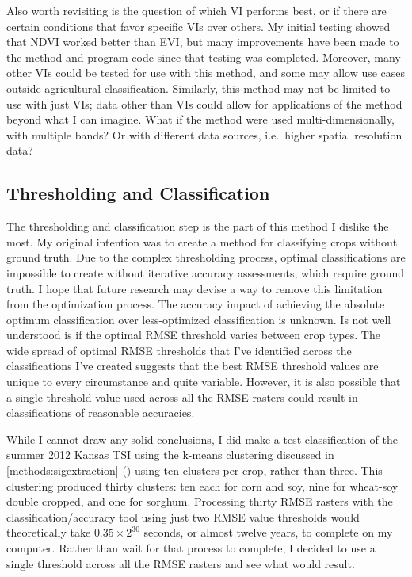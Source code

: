 Also worth revisiting is the question of which VI performs best, or if there are certain conditions that favor specific VIs over others. My initial testing showed that NDVI worked better than EVI, but many improvements have been made to the method and program code since that testing was completed. Moreover, many other VIs could be tested for use with this method, and some may allow use cases outside agricultural classification. Similarly, this method may not be limited to use with just VIs; data other than VIs could allow for applications of the method beyond what I can imagine. What if the method were used multi-dimensionally, with multiple bands? Or with different data sources, i.e.\ higher spatial resolution data?

\subsection{Thresholding and Classification}

The thresholding and classification step is the part of this method I dislike the most. My original intention was to create a method for classifying crops without ground truth. Due to the complex thresholding process, optimal classifications are impossible to create without iterative accuracy assessments, which require ground truth. I hope that future research may devise a way to remove this limitation from the optimization process. The accuracy impact of achieving the absolute optimum classification over less-optimized classification is unknown. Is not well understood is if the optimal RMSE threshold varies between crop types. The wide spread of optimal RMSE thresholds that I’ve identified across the classifications I've created suggests that the best RMSE threshold values are unique to every circumstance and quite variable. However, it is also possible that a single threshold value used across all the RMSE rasters could result in classifications of reasonable accuracies.

While I cannot draw any solid conclusions, I did make a test classification of the summer 2012 Kansas TSI using the k-means clustering discussed in \autoref{methods:sigextraction} () using ten clusters per crop, rather than three. This clustering produced thirty clusters: ten each for corn and soy, nine for wheat-soy double cropped, and one for sorghum. Processing thirty RMSE rasters with the classification/accuracy tool using just two RMSE value thresholds would theoretically take $0.35\times2^{30}$ seconds, or almost twelve years, to complete on my computer. Rather than wait for that process to complete, I decided to use a single threshold across all the RMSE rasters and see what would result.

